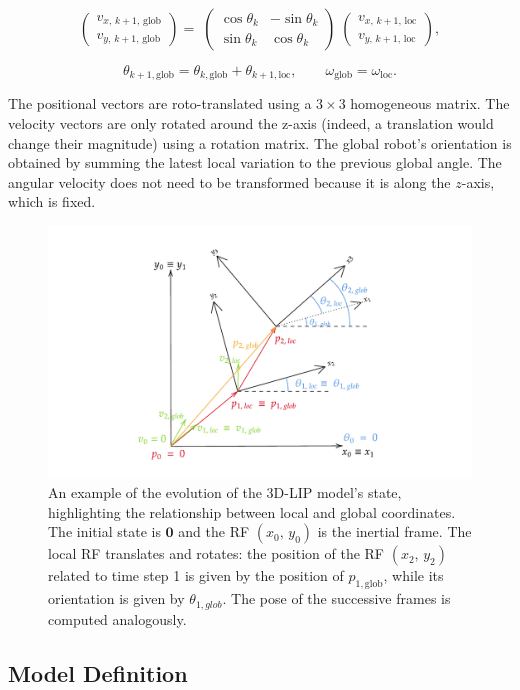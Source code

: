 \documentclass[main.tex]{subfiles}
\begin{document}
$$
\begin{pmatrix} v_{x,\,k+1,\,\text{glob} } \\ v_{y,\,k+1,\,\text{glob}}\end{pmatrix} = \; \begin{pmatrix} \cos\theta_k & -\sin\theta_k \\ \sin\theta_k & \cos\theta_k \end{pmatrix}\;
\begin{pmatrix}
v_{x,\,k+1,\,\text{loc} } \\ v_{y,\,k+1,\,\text{loc}}
\end{pmatrix},
$$

$$ 
\theta_{k+1, \text{glob}} = \theta_{k, \text{glob}} + \theta_{k+1, \text{loc}},
\qquad
\omega_{\text{glob}} = \omega_{\text{loc}}.
$$

The positional vectors are roto-translated using a $3\times3$ homogeneous matrix. The velocity vectors are only rotated around the z-axis (indeed, a translation would change their magnitude) using a rotation matrix. The global robot's orientation is obtained by summing the latest local variation to the previous global angle. The angular velocity does not need to be transformed because it is along the $z$-axis, which is fixed.

\begin{figure}
    \centering
    \includegraphics[width=1\linewidth]{figures/LIP/loc_to_glob_tfm.pdf}
    \caption{An example of the evolution of the 3D-LIP model's state, highlighting the relationship between local and global coordinates. The initial state is $\mathbf{0}$ and the RF $(x_0,\, y_0)$ is the inertial frame. The local RF translates and rotates: the position of the RF $(x_2,\, y_2)$ related to time step 1 is given by the position of $p_{1, \text{glob}}$, while its orientation is given by $\theta_{1, glob}$. The pose of the successive frames is computed analogously.}
    \label{fig:loc_to_glob_tfm}
\end{figure}

\subsection{Model Definition}
\end{document}

